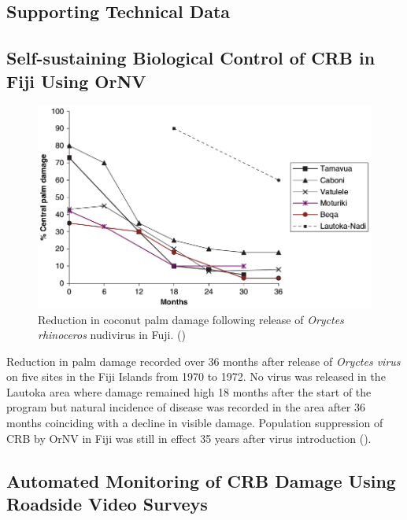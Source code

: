 \documentclass[12pt,letterpaper,english,bibliography=totocnumbered, abstract=on]{scrartcl}
\begin{document}
\newpage{}

%

\newpage{}
\begin{appendices}

\section{Supporting Technical Data}

\subsection{Self-sustaining Biological Control of CRB in Fiji Using OrNV}
\label{sub: fiji}

\begin{figure}[h]
\centering
\includegraphics[width=0.7\linewidth]{images/fiji}
\caption{Reduction in coconut palm damage following release of \textit{Oryctes rhinoceros} nudivirus in Fuji. (\cite{jackson_use_2009-1})}
\label{fig:fiji}
\end{figure}

Reduction in palm damage recorded over 36 months after release of \textit{Oryctes virus} on five sites in the Fiji Islands from 1970 to 1972. No virus was released in the Lautoka area where damage remained high 18 months after the start of the program but natural incidence of disease was recorded in the area after 36 months coinciding with a decline in visible damage. Population suppression of CRB by OrNV in Fiji was still in effect 35 years after virus introduction (\cite{bedford_g._o._long-term_2013}).

\clearpage

\subsection{Automated Monitoring of CRB Damage Using Roadside Video Surveys}


\end{appendices}
\end{document}
